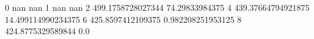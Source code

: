 0 nan nan
1 nan nan
2 499.1758728027344 74.29833984375
4 439.37664794921875 14.499114990234375
6 425.8597412109375 0.982208251953125
8 424.8775329589844 0.0
